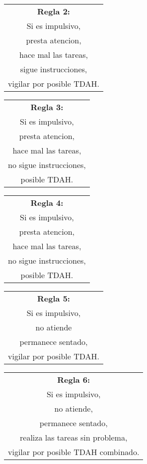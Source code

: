 \documentclass[letterpaper,12pt]{article}
\begin{document}
\begin{center}
\begin{tabular}{|c|}
\hline 
 \textbf{Regla 2:} \\
Si es impulsivo, \\
presta atencion, \\
hace mal las tareas, \\
sigue instrucciones, \\ 
vigilar por posible TDAH. \\
\hline 
\end{tabular} 
\end{center}

\begin{center}
\begin{tabular}{|c|}
\hline 
\textbf{Regla 3:} \\
Si es impulsivo, \\ 
presta atencion, \\
hace mal las tareas, \\
no sigue instrucciones, \\
posible TDAH. \\
\hline 
\end{tabular} 
\end{center}

\begin{center}
\begin{tabular}{|c|}
\hline 
\textbf{Regla 4:} \\
Si es impulsivo, \\
presta atencion, \\
hace mal las tareas, \\
no sigue instrucciones, \\
posible TDAH. \\
\hline 
\end{tabular} 
\end{center}

\begin{center}
	\begin{tabular}{|c|}
		\hline 
		\textbf{Regla 5:} \\
		Si es impulsivo, \\
		no atiende \\
		permanece sentado, \\
		vigilar por posible TDAH.\\
		\hline 
	\end{tabular} 
\end{center}

\begin{center}
	\begin{tabular}{|c|}
		\hline 
		\textbf{Regla 6:} \\
		Si es impulsivo, \\
		no atiende, \\
		permanece sentado, \\
		realiza las tareas sin problema, \\
		vigilar por posible TDAH combinado. \\
		\hline 
	\end{tabular} 
\end{center}
\end{document}
